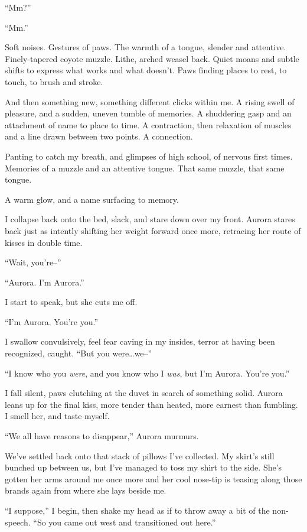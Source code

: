 ``Mm?''

``Mm.''

Soft noises. Gestures of paws. The warmth of a tongue, slender and attentive. Finely-tapered coyote muzzle. Lithe, arched weasel back. Quiet moans and subtle shifts to express what works and what doesn't. Paws finding places to rest, to touch, to brush and stroke.

And then something new, something different clicks within me. A rising swell of pleasure, and a sudden, uneven tumble of memories. A shuddering gasp and an attachment of name to place to time. A contraction, then relaxation of muscles and a line drawn between two points. A connection.

Panting to catch my breath, and glimpses of high school, of nervous first times. Memories of a muzzle and an attentive tongue. That same muzzle, that same tongue.

A warm glow, and a name surfacing to memory.

I collapse back onto the bed, slack, and stare down over my front. Aurora stares back just as intently shifting her weight forward once more, retracing her route of kisses in double time.

``Wait, you're--''

``Aurora. I'm Aurora.''

I start to speak, but she cuts me off.

``I'm Aurora. You're you.''

I swallow convulsively, feel fear caving in my insides, terror at having been recognized, caught. ``But you were\ldots{}we--''

``I know who you \emph{were}, and you know who I \emph{was}, but I'm Aurora. You're you.''

I fall silent, paws clutching at the duvet in search of something solid. Aurora leans up for the final kiss, more tender than heated, more earnest than fumbling. I smell her, and taste myself.

\secdiv{}

\noindent ``We all have reasons to disappear,'' Aurora murmurs.

We've settled back onto that stack of pillows I've collected. My skirt's still bunched up between us, but I've managed to toss my shirt to the side. She's gotten her arms around me once more and her cool nose-tip is teasing along those brands again from where she lays beside me.

``I suppose,'' I begin, then shake my head as if to throw away a bit of the non-speech. ``So you came out west and transitioned out here.''


